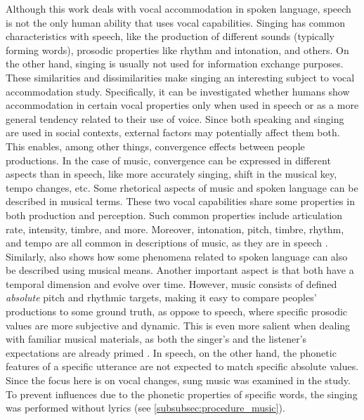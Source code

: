 Although this work deals with vocal accommodation in spoken language, speech is not the only human ability that uses vocal capabilities.
Singing has common characteristics with speech, like the production of different sounds (typically forming words), prosodic properties like rhythm and intonation, and others.
On the other hand, singing is usually not used for information exchange purposes. 
These similarities and dissimilarities make singing an interesting subject to vocal accommodation study.
Specifically, it can be investigated whether humans show accommodation in certain vocal properties only when used in speech or as a more general tendency related to their use of voice.
Since both speaking and singing are used in social contexts, external factors may potentially affect them both.
This enables, among other things, convergence effects between people productions.
In the case of music, convergence can be expressed in different aspects than in speech, like more accurately singing, shift in the musical key, tempo changes, etc.
Some rhetorical aspects of music and spoken language can be described in musical terms.
These two vocal capabilities share some properties in both production and perception.
Such common properties include articulation rate, intensity, timbre, and more.
Moreover, intonation, pitch, timbre, rhythm, and tempo are all common in descriptions of music, as they are in speech \citep{Molino2000toward, Jackendoff2009parallels}.
Similarly, \citet{Day2013speech} also shows how some phenomena related to spoken language can also be described using musical means.
Another important aspect is that both have a temporal dimension and evolve over time.
However, music consists of defined \emph{absolute} pitch and rhythmic targets, making it easy to compare peoples' productions to some ground truth, as oppose to speech, where specific prosodic values are more subjective and dynamic.
This is even more salient when dealing with familiar musical materials, as both the singer's and the listener's expectations are already primed \citep{Meyer2008emotion}.
In speech, on the other hand, the phonetic features of a specific utterance are not expected to match specific absolute values.
Since the focus here is on vocal changes, sung music was examined in the study.
To prevent influences due to the phonetic properties of specific words, the singing was performed without lyrics (see \cref{subsubsec:procedure_music}).

